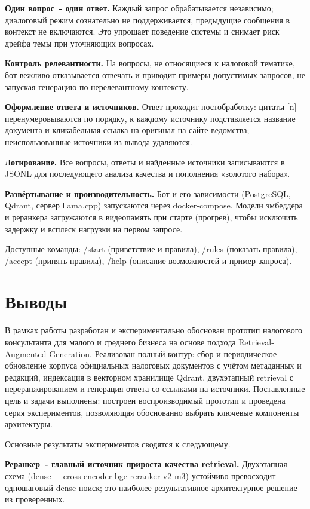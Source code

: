 \documentclass[a4paper,12pt]{article}
\begin{document}
\textbf{Один вопрос~- один ответ.} Каждый запрос обрабатывается независимо; диалоговый режим сознательно не поддерживается, предыдущие сообщения в контекст не включаются. Это упрощает поведение системы и снимает риск дрейфа темы при уточняющих вопросах.

\textbf{Контроль релевантности.} На вопросы, не относящиеся к налоговой тематике, бот вежливо отказывается отвечать и приводит примеры допустимых запросов, не запуская генерацию по нерелевантному контексту.

\textbf{Оформление ответа и источников.} Ответ проходит постобработку: цитаты [n] перенумеровываются по порядку, к каждому источнику подставляется название документа и кликабельная ссылка на оригинал на сайте ведомства; неиспользованные источники из вывода удаляются.

\textbf{Логирование.} Все вопросы, ответы и найденные источники записываются в JSONL для последующего анализа качества и пополнения «золотого набора».

\textbf{Развёртывание и производительность.} Бот и его зависимости (PostgreSQL, Qdrant, сервер llama.cpp) запускаются через docker-compose. Модели эмбеддера и реранкера загружаются в видеопамять при старте (прогрев), чтобы исключить задержку и всплеск нагрузки на первом запросе.

Доступные команды: /start (приветствие и правила), /rules (показать правила), /accept (принять правила), /help (описание возможностей и пример запроса).

\newpage
\section{Выводы}
\label{sec:conclusions}

В рамках работы разработан и экспериментально обоснован прототип налогового консультанта для малого и среднего бизнеса на основе подхода Retrieval-Augmented Generation. Реализован полный контур: сбор и периодическое обновление корпуса официальных налоговых документов с учётом метаданных и редакций, индексация в векторном хранилище Qdrant, двухэтапный retrieval с переранжированием и генерация ответа со ссылками на источники. Поставленные цель и задачи выполнены: построен воспроизводимый прототип и проведена серия экспериментов, позволяющая обоснованно выбрать ключевые компоненты архитектуры.

Основные результаты экспериментов сводятся к следующему.

\textbf{Реранкер~- главный источник прироста качества retrieval.} Двухэтапная схема (dense + cross-encoder bge-reranker-v2-m3) устойчиво превосходит одношаговый dense-поиск; это наиболее результативное архитектурное решение из проверенных.
\end{document}

